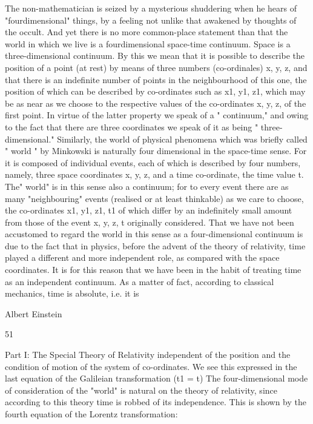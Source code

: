 \documentclass{article}
\begin{document}
The non-mathematician is seized by a mysterious shuddering when he hears of "fourdimensional" things, by a feeling not unlike that awakened by thoughts of the occult. And
yet there is no more common-place statement than that the world in which we live is a fourdimensional space-time continuum.
Space is a three-dimensional continuum. By this we mean that it is possible to describe
the position of a point (at rest) by means of three numbers (co-ordinales) x, y, z, and that
there is an indefinite number of points in the neighbourhood of this one, the position of
which can be described by co-ordinates such as x1, y1, z1, which may be as near as we
choose to the respective values of the co-ordinates x, y, z, of the first point. In virtue of the
latter property we speak of a " continuum," and owing to the fact that there are three coordinates we speak of it as being " three-dimensional."
Similarly, the world of physical phenomena which was briefly called " world " by
Minkowski is naturally four dimensional in the space-time sense. For it is composed of
individual events, each of which is described by four numbers, namely, three space coordinates x, y, z, and a time co-ordinate, the time value t. The" world" is in this sense also a
continuum; for to every event there are as many "neighbouring" events (realised or at least
thinkable) as we care to choose, the co-ordinates x1, y1, z1, t1 of which differ by an
indefinitely small amount from those of the event x, y, z, t originally considered. That we
have not been accustomed to regard the world in this sense as a four-dimensional
continuum is due to the fact that in physics, before the advent of the theory of relativity,
time played a different and more independent role, as compared with the space coordinates.
It is for this reason that we have been in the habit of treating time as an independent
continuum. As a matter of fact, according to classical mechanics, time is absolute, i.e. it is

Albert Einstein

51

Part I: The Special Theory of Relativity
independent of the position and the condition of motion of the system of co-ordinates. We
see this expressed in the last equation of the Galileian transformation (t1 = t)
The four-dimensional mode of consideration of the "world" is natural on the theory of
relativity, since according to this theory time is robbed of its independence. This is shown
by the fourth equation of the Lorentz transformation:
\end{document}
